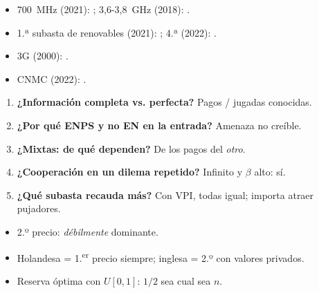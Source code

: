 \documentclass{article}
\begin{document}
\begin{columnas}
\anexorepaso
{}
\begin{itemize}
\item 700~MHz (2021): ; 3,6-3,8~GHz (2018): .
\item 1.ª subasta de renovables (2021): ; 4.ª (2022): .
\item 3G (2000): .
\item CNMC (2022): .
\end{itemize}
\begin{enumerate}
\item \textbf{¿Información completa vs. perfecta?} Pagos / jugadas conocidas.
\item \textbf{¿Por qué ENPS y no EN en la entrada?} Amenaza no creíble.
\item \textbf{¿Mixtas: de qué dependen?} De los pagos del \emph{otro}.
\item \textbf{¿Cooperación en un dilema repetido?} Infinito y $\beta$ alto: sí.
\item \textbf{¿Qué subasta recauda más?} Con VPI, todas igual; importa atraer pujadores.
\end{enumerate}
\begin{trampa}
\begin{itemize}
\item 2.º precio: \emph{débilmente} dominante.
\item Holandesa = 1.\textsuperscript{er} precio siempre; inglesa = 2.º con valores privados.
\item Reserva óptima con $U[0,1]$: $1/2$ sea cual sea $n$.
\end{itemize}
\end{trampa}

\end{columnas}
\end{document}

